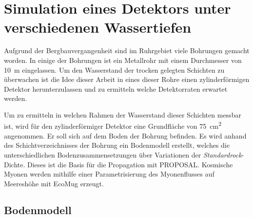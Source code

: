 \chapter{Simulation eines Detektors unter verschiedenen Wassertiefen}


Aufgrund der Bergbauvergangenheit sind im Ruhrgebiet viele Bohrungen gemacht worden.
In einige der Bohrungen ist ein Metallrohr mit einem Durchmesser von \SI[]{10}[]{m} 
eingelassen.
Um den Wasserstand der trocken gelegten Schichten zu überwachen
ist die Idee dieser Arbeit in eines dieser Rohre einen zylinderförmigen Detektor 
herunterzulassen und zu ermitteln welche Detektorraten erwartet werden.

Um zu ermitteln in welchen Rahmen der Wasserstand dieser Schichten messbar ist,
wird für den zylinderförmiger Detektor eine Grundfläche von 
\SI[]{75}[]{cm^2} angenommen. Er soll sich auf dem Boden der Bohrung befinden.
Es wird anhand des Schichtverzeichnisses der Bohrung ein Bodenmodell erstellt,
welches die unterschiedlichen Bodenzusammensetzungen über Variationen der
\textit{Standardrock}-Dichte.
Dieses ist die Basis für die Propagation mit PROPOSAL.
Kosmische Myonen werden mithilfe einer Parametrisierung des Myonenflusses auf Meereshöhe
mit EcoMug erzeugt.






\section{Bodenmodell}
\label{sec:bodenmodell}
